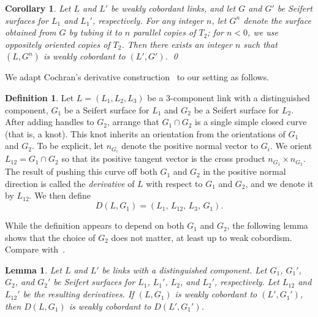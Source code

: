 \documentclass[a4paper, 11pt]{amsart}
\newtheorem{corollary}[theorem]{Corollary}
\newtheorem{lemma}[theorem]{Lemma}
\theoremstyle{definition}
\newtheorem{definition}[theorem]{Definition}
\begin{document}
\begin{corollary}
Let $L$ and $L'$ be weakly cobordant links, and let $G$ and $G'$ be Seifert surfaces for $L_1$ and $L_1'$, respectively.
For any integer $n$, let $G^n$ denote the surface obtained from $G$ by tubing it to $n$ parallel copies of $T_2$; for $n<0$, we use oppositely oriented copies of $T_2$. Then there exists an integer $n$ such that $(L,G^n)$ is weakly cobordant to $(L',G')$. \qed
\end{corollary}

We adapt Cochran's derivative construction~\cite[Section~4]{C3} to our setting as follows.


\begin{definition}\label{defn:deriv}
Let $L=(L_1, L_2, L_3)$ be a $3$-component link with a distinguished component, $G_1$ be a Seifert surface for $L_1$ 
 and  $G_2$ be a Seifert surface for $L_2$. 
 After adding handles to $G_2$, arrange that $G_1\cap G_2$ is a single simple closed curve (that is, a knot). This knot inherits an orientation from the orientations of $G_1$ and $G_2$. To be explicit, let $n_{G_i}$ denote the positive normal vector to $G_i$. We orient $L_{12}=G_1\cap G_2$ so that its positive tangent vector is the cross product $n_{G_1}\times n_{G_2}$. The result of pushing this curve off both $G_1$ and $G_2$ in the positive normal direction is called the \emph{derivative} of $L$ with respect to $G_1$ and $G_2$, and we denote it by $L_{12}$. We then define
\[
D(L,G_1)=\left(L_1,\, L_{12},\, L_3,\, G_1\right).
\]
\end{definition}

While the definition appears to depend on both $G_1$ and $G_2$, the following lemma shows that the choice of $G_2$ does not matter, at least up to weak cobordism. Compare with~\cite[Theorem~4.2]{C3}.

\begin{lemma}\label{lem:independentofG2}
Let $L$ and $L'$ be links with a distinguished component. Let $G_1$, $G_1'$, $G_2$, and $G_2'$ be Seifert surfaces for $L_1$, $L_1'$, $L_2$, and $L_2'$, respectively.
Let $L_{12}$ and $L_{12}'$ be the resulting derivatives. If $(L,G_1)$ is weakly cobordant to $(L',G_1')$, then $D(L,G_1)$ is weakly cobordant to $D(L',G_1')$.
\end{lemma}
\end{document}
